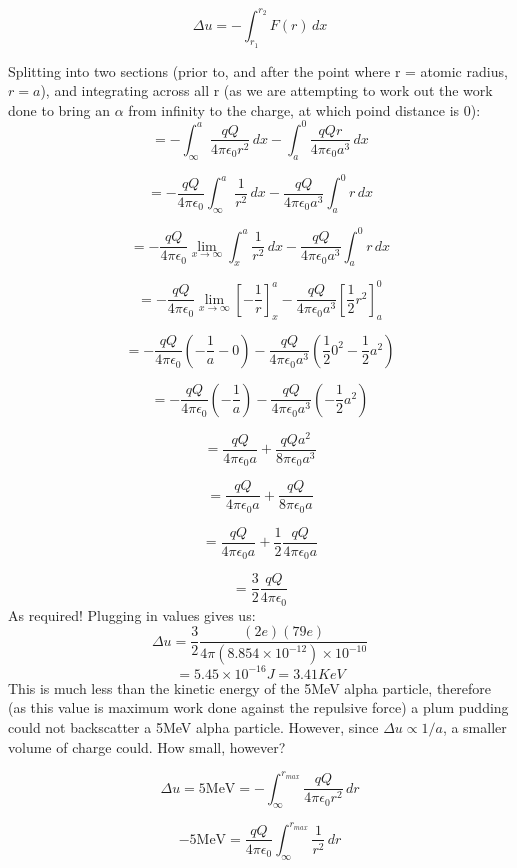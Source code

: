 \[
    \Delta u = - \int_{r_1}^{r_2} F(r) \, dx
\]

Splitting into two sections (prior to, and after the point where r = atomic radius, $r = a$), and integrating across all r (as we are attempting to work out the work done to bring an $\alpha$ from infinity to the charge, at which poind distance is 0):
\[
    = -\int_{\infty}^{a} \frac{qQ}{4 \pi \epsilon_0 r^2} \, dx - \int_{a}^{0} \frac{qQr}{4 \pi \epsilon_0 a^3} \, dx
\]

\[
    = -\frac{qQ}{4 \pi \epsilon_0}\int_{\infty}^{a} \frac{1}{r^2} \, dx - \frac{qQ}{4 \pi \epsilon_0 a^3}\int_{a}^{0} r \, dx
\]

\[
    = -\frac{qQ}{4 \pi \epsilon_0} \lim_{x \to \infty} \int_{x}^{a} \frac{1}{r^2} \, dx - \frac{qQ}{4 \pi \epsilon_0 a^3}\int_{a}^{0} r \, dx
\]

\[
        = -\frac{qQ}{4 \pi \epsilon_0} \lim_{x \to \infty} \left[- \frac{1}{r}\right]_x^a - \frac{qQ}{4 \pi \epsilon_0 a^3} \left[\frac{1}{2}r^2\right]_a^0
\]

\[
        = -\frac{qQ}{4 \pi \epsilon_0} \left(-\frac{1}{a} - 0\right) - \frac{qQ}{4 \pi \epsilon_0 a^3} \left(\frac{1}{2}0^2 - \frac{1}{2}a^2\right)
\]

\[
        = -\frac{qQ}{4 \pi \epsilon_0} \left(-\frac{1}{a}\right) - \frac{qQ}{4 \pi \epsilon_0 a^3} \left(- \frac{1}{2}a^2\right)
\]

\[
    = \frac{qQ}{4 \pi \epsilon_0 a} + \frac{qQa^2}{8 \pi \epsilon_0 a^3}
\]

\[
    = \frac{qQ}{4 \pi \epsilon_0 a} + \frac{qQ}{8 \pi \epsilon_0 a}
\]

\[
    = \frac{qQ}{4 \pi \epsilon_0 a} + \frac{1}{2}\frac{qQ}{4 \pi \epsilon_0 a}
\]

\[
    = \frac{3}{2}\frac{qQ}{4 \pi \epsilon_0}
\]
As required! Plugging in values gives us:
\[
    \Delta u = \frac{3}{2} \frac{(2e)(79e)}{4 \pi (8.854 \times 10^{-12}) \times 10^{-10}}
\]
\[
    = 5.45 \times 10^{-16}J = 3.41KeV
\]
This is much less than the kinetic energy of the 5MeV alpha particle, therefore (as this value is maximum work done against the repulsive force) a plum pudding could not backscatter a 5MeV alpha particle. However, since $\Delta u \propto 1/a$, a smaller volume of charge could. How small, however?

\[
    \Delta u = 5 \text{MeV} = -\int_{\infty}^{r_{max}} \frac{qQ}{4 \pi \epsilon_0 r^2} \, dr
\]

\[
    -5 \text{MeV} = \frac{qQ}{4 \pi \epsilon_0}\int_{\infty}^{r_{max}} \frac{1}{r^2} \, dr
\]


